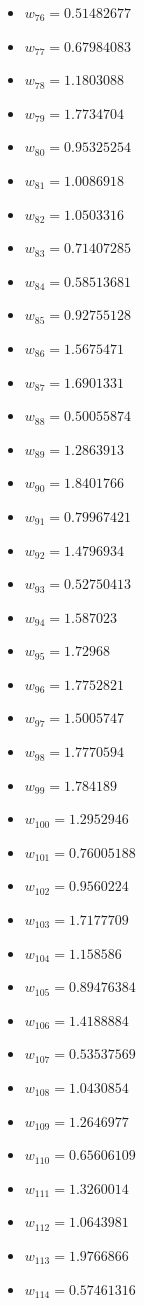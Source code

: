 \documentclass[11pt]{article}
\begin{document}
\begin{itemize}
\item $w_{76} = 0.51482677$
\item $w_{77} = 0.67984083$
\item $w_{78} = 1.1803088$
\item $w_{79} = 1.7734704$
\item $w_{80} = 0.95325254$
\item $w_{81} = 1.0086918$
\item $w_{82} = 1.0503316$
\item $w_{83} = 0.71407285$
\item $w_{84} = 0.58513681$
\item $w_{85} = 0.92755128$
\item $w_{86} = 1.5675471$
\item $w_{87} = 1.6901331$
\item $w_{88} = 0.50055874$
\item $w_{89} = 1.2863913$
\item $w_{90} = 1.8401766$
\item $w_{91} = 0.79967421$
\item $w_{92} = 1.4796934$
\item $w_{93} = 0.52750413$
\item $w_{94} = 1.587023$
\item $w_{95} = 1.72968$
\item $w_{96} = 1.7752821$
\item $w_{97} = 1.5005747$
\item $w_{98} = 1.7770594$
\item $w_{99} = 1.784189$
\item $w_{100} = 1.2952946$
\item $w_{101} = 0.76005188$
\item $w_{102} = 0.9560224$
\item $w_{103} = 1.7177709$
\item $w_{104} = 1.158586$
\item $w_{105} = 0.89476384$
\item $w_{106} = 1.4188884$
\item $w_{107} = 0.53537569$
\item $w_{108} = 1.0430854$
\item $w_{109} = 1.2646977$
\item $w_{110} = 0.65606109$
\item $w_{111} = 1.3260014$
\item $w_{112} = 1.0643981$
\item $w_{113} = 1.9766866$
\item $w_{114} = 0.57461316$

\end{itemize}
\end{document}
